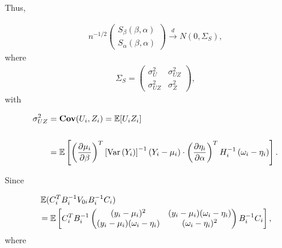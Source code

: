 \documentclass[UTF8,a4paper,10pt]{article}
\begin{document}
Thus,

\begin{equation*}
  \begin{aligned}
n^{-1/2}
\left(\begin{array}{l}S_{\beta}(\beta, \alpha) \\ S_{\alpha}(\beta, \alpha)\end{array}\right)\xrightarrow{d} N(0,\Sigma_{S}),
  \end{aligned}
\end{equation*}
where
\begin{equation*}
  \begin{aligned}
    \Sigma_{S} = \begin{pmatrix}
      \sigma_{U}^2 & \sigma_{UZ}^2\\
      \sigma_{UZ}^2 & \sigma_{Z}^2
    \end{pmatrix},
  \end{aligned}
\end{equation*}
with

\begin{equation*}
  \begin{aligned}
    \sigma_{UZ}^2 &= \operatorname{\textbf{Cov}}(U_i,Z_i) = \operatorname{\mathbb{E}}[U_i Z_i] \\
    \\
  &= \operatorname{\mathbb{E}}\left[\left(\dfrac{\partial \mu_{i}}{\partial \beta}\right)^{T}\left[\operatorname{Var}\left(Y_{i}\right)\right]^{-1}\left(Y_{i}-\mu_{i}\right) \cdot \left(\dfrac{\partial \eta_{i}}{\partial \alpha}\right)^{T} H_{i}^{-1}\left(\omega_{i}-\eta_{i}\right)\right].
  \end{aligned}
\end{equation*}

Since

\begin{equation*}
  \begin{aligned}
    &\operatorname{\mathbb{E}}(C_{i}^{T} B_{i}^{-1} V_{0 i} B_{i}^{-1} C_{i}) \\
    &= \operatorname{\mathbb{E}}\left[C_{i}^{T} B_{i}^{-1}
    \begin{pmatrix}
      (y_i-\mu_i)^2&(y_i-\mu_i)(\omega_i-\eta_i)\\
      (y_i-\mu_i)(\omega_i-\eta_i)&(\omega_i-\eta_i)^2\\
    \end{pmatrix}
    B_{i}^{-1} C_{i}
    \right],
  \end{aligned}
\end{equation*}
where
\end{document}
